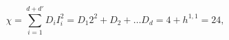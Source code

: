 \begin{equation}
  \chi = \sum_{i=1}^{d+d'} D_i I_i^2= D_1 2^2 + D_2 + \dots D_d = 4+
  h^{1,1}= 24,
\end{equation}

